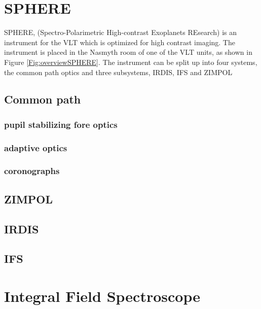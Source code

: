 \documentclass[twoside,single]{lion-msc}
\begin{document}
\section{SPHERE}
SPHERE, (Spectro-Polarimetric High-contrast Exoplanets REsearch) is an instrument for the VLT which is optimized for high contrast imaging. The instrument is placed in the Nasmyth room of one of the VLT units, as shown in Figure \ref{Fig:overviewSPHERE}. The instrument can be split up into four systems, the common path optics and three subsystems, IRDIS, IFS and ZIMPOL\\ 

\subsection{Common path}
\subsubsection{pupil stabilizing fore optics}
\subsubsection{adaptive optics}
\subsubsection{coronographs}

\subsection{ZIMPOL}
\subsection{IRDIS}
\subsection{IFS}

\section{Integral Field Spectroscope}
\end{document}
